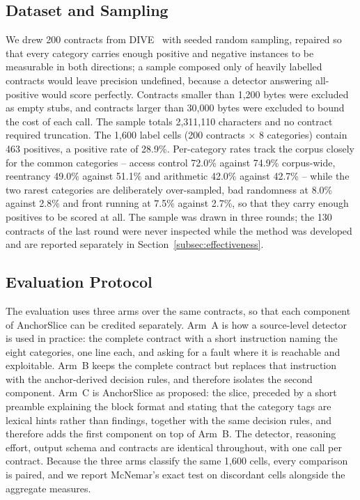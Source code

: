 \documentclass{ieeeaccess}
\begin{document}
\subsection{Dataset and Sampling}\label{subsec:dataset}
We drew 200 contracts from DIVE~\cite{dive2026} with seeded random sampling, repaired so that every category carries enough positive and negative instances to be measurable in both directions; a sample composed only of heavily labelled contracts would leave precision undefined, because a detector answering all-positive would score perfectly. Contracts smaller than 1,200 bytes were excluded as empty stubs, and contracts larger than 30,000 bytes were excluded to bound the cost of each call. The sample totals 2,311,110 characters and no contract required truncation. The 1,600 label cells (200 contracts $\times$ 8 categories) contain 463 positives, a positive rate of 28.9\%. Per-category rates track the corpus closely for the common categories -- access control 72.0\% against 74.9\% corpus-wide, reentrancy 49.0\% against 51.1\% and arithmetic 42.0\% against 42.7\% -- while the two rarest categories are deliberately over-sampled, bad randomness at 8.0\% against 2.8\% and front running at 7.5\% against 2.7\%, so that they carry enough positives to be scored at all. The sample was drawn in three rounds; the 130 contracts of the last round were never inspected while the method was developed and are reported separately in Section~\ref{subsec:effectiveness}.

\subsection{Evaluation Protocol}\label{subsec:protocol}
The evaluation uses three arms over the same contracts, so that each component of AnchorSlice can be credited separately. Arm~A is how a source-level detector is used in practice: the complete contract with a short instruction naming the eight categories, one line each, and asking for a fault where it is reachable and exploitable. Arm~B keeps the complete contract but replaces that instruction with the anchor-derived decision rules, and therefore isolates the second component. Arm~C is AnchorSlice as proposed: the slice, preceded by a short preamble explaining the block format and stating that the category tags are lexical hints rather than findings, together with the same decision rules, and therefore adds the first component on top of Arm~B. The detector, reasoning effort, output schema and contracts are identical throughout, with one call per contract. Because the three arms classify the same 1,600 cells, every comparison is paired, and we report McNemar's exact test on discordant cells alongside the aggregate measures.
\end{document}

